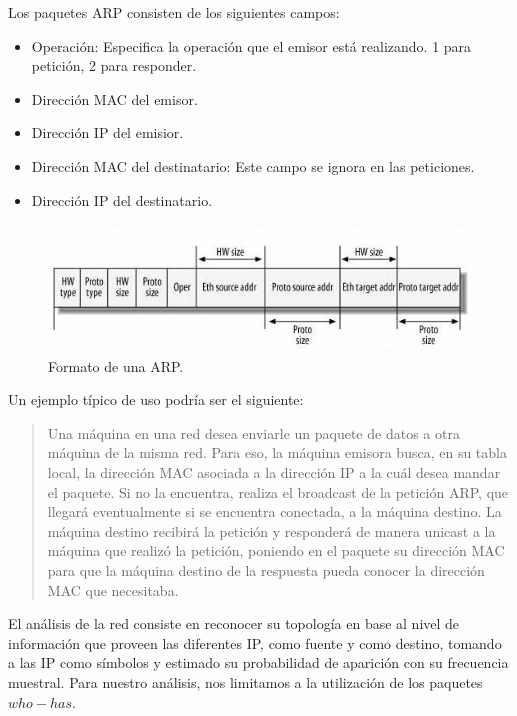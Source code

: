 \documentclass[10pt, a4paper]{article}
\begin{document}
Los paquetes ARP consisten de los siguientes campos:
\begin{itemize}
\item Operación: Especifica la operación que el emisor está realizando. 1 para petición, 2 para responder.
\item Dirección MAC del emisor.
\item Dirección IP del emisior.
\item Dirección MAC del destinatario: Este campo se ignora en las peticiones.
\item Dirección IP del destinatario.
\end{itemize}
\begin{figure}[H] %
\begin{center}
\includegraphics[width=350pt]{../imgs/arp.jpg}
\caption{Formato de una ARP.}
\end{center}
\end{figure}

Un ejemplo típico de uso podría ser el siguiente:\newline

\begin{quotation}
Una máquina en una red desea enviarle un paquete de datos a otra máquina de la misma red. Para eso, la máquina emisora busca, en su tabla local, la dirección MAC asociada a la dirección IP a la cuál desea mandar el paquete. Si no la encuentra, realiza el broadcast de la petición ARP, que llegará eventualmente si se encuentra conectada, a la máquina destino. 
La máquina destino recibirá la petición y responderá de manera unicast a la máquina que realizó la petición, poniendo en el paquete su dirección MAC para que la máquina destino de la respuesta pueda conocer la dirección MAC que necesitaba.
\end{quotation}

El análisis de la red consiste en reconocer su topología en base al nivel de información que proveen las diferentes IP, como fuente y como destino, tomando a las IP como símbolos y estimado su probabilidad de aparición con su frecuencia muestral. Para nuestro análisis, nos limitamos a la utilización de los paquetes $who-has$.
\end{document}
